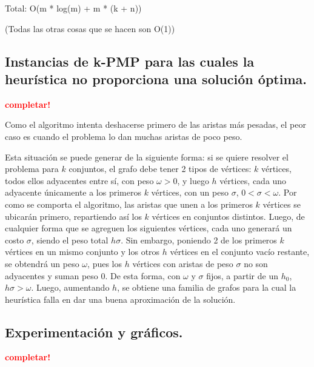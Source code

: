 Total: O(m * log(m) + m * (k + n))

(Todas las otras cosas que se hacen son O(1))



\newpage
\subsection{Instancias de k-PMP para las cuales la heurística no proporciona
            una solución óptima.}
\vspace*{0.3cm}
\textcolor{red}{\textbf{completar!}}

Como el algoritmo intenta deshacerse primero de las aristas más pesadas, el
peor caso es cuando el problema lo dan muchas aristas de poco peso.

Esta situación se puede generar de la siguiente forma: si se quiere resolver el
problema para $k$ conjuntos, el grafo debe tener 2 tipos de vértices: $k$
vértices, todos ellos adyacentes entre sí, con peso $\omega > 0$, y luego $h$
vértices, cada uno adyacente únicamente a los primeros $k$ vértices, con un
peso $\sigma$, $0 < \sigma < \omega$.  Por como se comporta el algoritmo, las
aristas que unen a los primeros $k$ vértices se ubicarán primero, repartiendo
así los $k$ vértices en conjuntos distintos. Luego, de cualquier forma que se
agreguen los siguientes vértices, cada uno generará un costo $\sigma$, siendo
el peso total $h \sigma$. Sin embargo, poniendo 2 de los primeros $k$ vértices
en un mismo conjunto y los otros $h$ vértices en el conjunto vacío restante,
se obtendrá un peso $\omega$, pues los $h$ vértices con aristas de peso
$\sigma$ no son adyacentes y suman peso $0$. De esta forma, con $\omega$ y
$\sigma$ fijos, a partir de un $h_0$, $h \sigma > \omega$. Luego, aumentando
$h$, se obtiene una familia de grafos para la cual la heurística falla en dar
una buena aproximación de la solución.


\newpage \subsection{Experimentación y gráficos.}
\vspace*{0.3cm}

\textcolor{red}{\textbf{completar!}}

